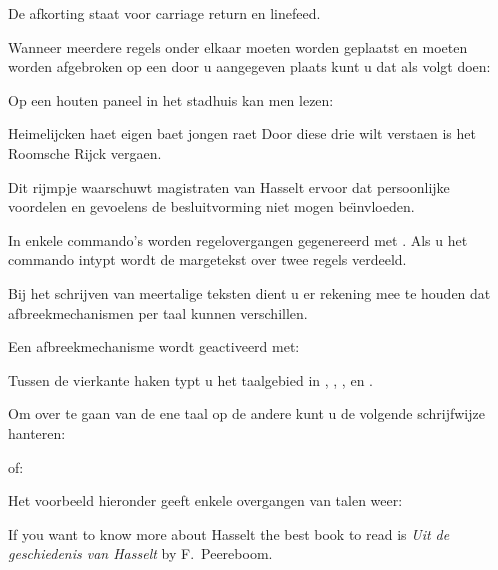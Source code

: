 
De afkorting \type{\crlf} staat voor carriage return en
linefeed.

Wanneer meerdere regels onder elkaar moeten worden geplaatst
en moeten worden afgebroken op een door u aangegeven plaats
kunt u dat als volgt doen:


\startbuffer
Op een houten paneel in het stadhuis kan men lezen:

\startregels
Heimelijcken haet
eigen baet
jongen raet
Door diese drie wilt verstaen
is het Roomsche Rijck vergaen.
\stopregels

Dit rijmpje waarschuwt magistraten van Hasselt ervoor dat
persoonlijke voordelen en gevoelens de besluitvorming
niet mogen be\"{\i}nvloeden.
\stopbuffer

\typebuffer

\haalbuffer

In enkele commando's worden regelovergangen gegenereerd met
\type{\\}. Als u het commando 
intypt wordt de margetekst over twee regels verdeeld.




Bij het schrijven van meertalige teksten dient u er rekening
mee te houden dat afbreekmechanismen per taal kunnen
verschillen.

Een afbreekmechanisme wordt geactiveerd met:


Tussen de vierkante haken typt u het taalgebied in
, , ,  en .

Om over te gaan van de ene taal op de andere kunt u de
volgende schrijfwijze hanteren:

\starttypen
\taal[nl] \taal[en]  \taal[de]  \taal[fr]  \taal[sp]
\stoptypen

of:

\starttypen
\nl  \en  \de  \fr  \sp
\stoptypen

Het voorbeeld hieronder geeft enkele overgangen van talen
weer:

\startbuffer
\en If you want to know more about Hasselt the best book to
read is {\nl \em Uit de geschiedenis van Hasselt} by
F.~Peereboom.
\stopbuffer

